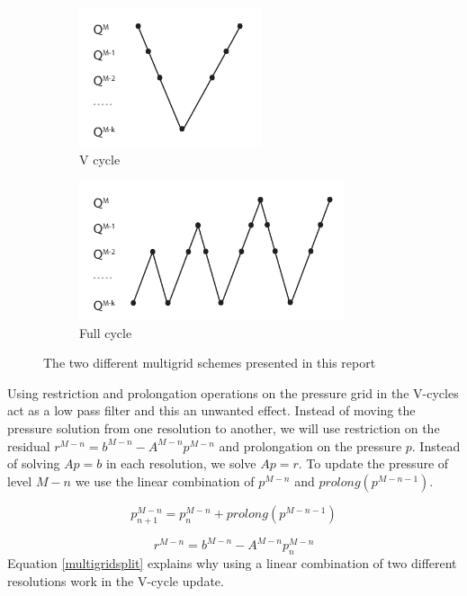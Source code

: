 \begin{figure}[ht!]
\centering
\begin{subfigure}[]{0.3\textwidth}
\includegraphics[height=41mm]{img/vcycle.pdf}
\caption{V cycle}
\end{subfigure}
\begin{subfigure}[]{0.3\textwidth}
\includegraphics[height=41mm]{img/fullcycle.pdf}
\caption{Full cycle}
\end{subfigure}
\caption{The two different multigrid schemes presented in this report}
\label{multigrid}
\end{figure}
\noindent
Using restriction and prolongation operations on the pressure grid in the V-cycles act as a low pass filter and this an unwanted effect. Instead of moving the pressure solution from one resolution to another, we will use restriction on the residual $r^{M-n} = b^{M-n} - A^{M-n}p^{M-n}$ and prolongation on the pressure $p$. Instead of solving $Ap = b$ in each resolution, we solve $Ap = r$. To update the pressure of level $M-n$ we use the linear combination of $p^{M-n}$ and $prolong(p^{M-n-1})$.

\begin{equation}
p^{M-n}_{n+1} = p^{M-n}_n + prolong(p^{M-n-1})
\end{equation}

\begin{equation}
r^{M-n} = b^{M-n} - A^{M-n} p^{M-n}_n 
\end{equation}
\noindent
Equation \ref{multigridsplit} explains why using a linear combination of two different resolutions work in the V-cycle update.


